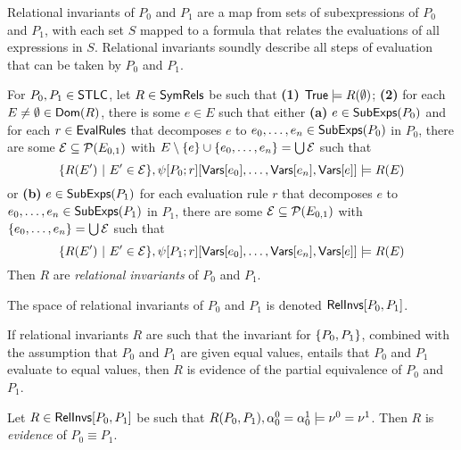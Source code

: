 Relational invariants of $P_0$ and $P_1$ are a map from sets of
subexpressions of $P_0$ and $P_1$, with each set $S$ mapped to a
formula that relates the evaluations of all expressions in $S$.
%
Relational invariants soundly describe all steps of evaluation that
can be taken by $P_0$ and $P_1$.
\begin{defn}
  \label{defn:rel-invs}
  For $P_0, P_1 \in \mathsf{STLC}$, let $R \in \mathsf{SymRels}$ be such that %
  \textbf{(1)} $\mathsf{True} \models R(\emptyset)$;
  \textbf{(2)} for each $E \not= \emptyset \in \mathsf{Dom}(R)$, %
  there is some $e \in E$ such that either %
  \textbf{(a)} $e \in \mathsf{SubExps}(P_0)$ and for each $r \in
  \mathsf{EvalRules}$ that decomposes $e$ to $e_0, \ldots, e_n \in
  \mathsf{SubExps}(P_0)$ in $P_0$,
  there are some $\mathcal{E} \subseteq \mathcal{P}(E_{0, 1})$ with
  $E  \setminus \{  e  \} \cup \{  e_0, \ldots, e_n  \} = \bigcup
  \mathcal{E}$ such that
  \[ \setformer{ R(E') }{ E' \in \mathcal{E} }, %
  \subs{ \symstep{P_0}{ r } }{ %
    \vars[ e_0 ], \ldots, \vars[ e_n ], \vars[ e ] } %
  \entails R( E )
  \]
  or
  \textbf{(b)} $e \in \mathsf{SubExps}(P_1)$ for each evaluation rule $r$ that
  decomposes $e$
  to $e_0, \ldots, e_n \in \mathsf{SubExps}(P_1)$ in $P_1$,
  there are some $\mathcal{E} \subseteq \mathcal{P}(E_{0, 1})$ with $\{ 
    e_0, \ldots, e_n  \} = \bigcup \mathcal{E}$ such that
  \[ \setformer{ R(E') }{ E' \in \mathcal{E} }, %
  \subs{ \symstep{P_1}{ r } }{ %
    \vars[ e_0 ], \ldots, \vars[ e_n ], \vars[ e ] } %
  \entails R(E)
  \]
  Then $R$ are \emph{relational invariants} of $P_0$ and $P_1$.
\end{defn}
%
The space of relational invariants of $P_0$ and $P_1$ is denoted
$\mathsf{RelInvs}[ P_0, P_1 ]$.

If relational invariants $R$ are such that the invariant for $\{ 
  P_0, P_1  \}$, combined with the assumption that $P_0$ and $P_1$ are
given equal values, entails that $P_0$ and $P_1$ evaluate to equal
values, then $R$ is evidence of the partial equivalence of $P_0$ and
$P_1$.
%
\begin{defn}
  \label{defn:eq-pf}
  Let $R \in \mathsf{RelInvs}[ P_0, P_1 ]$ be such that $R(P_0, P_1), \alpha^0_0
  = \alpha^1_0 \models \nu^0 = \nu^1$.
  Then $R$ is \emph{evidence} of $P_0 \equiv P_1$.
\end{defn}

